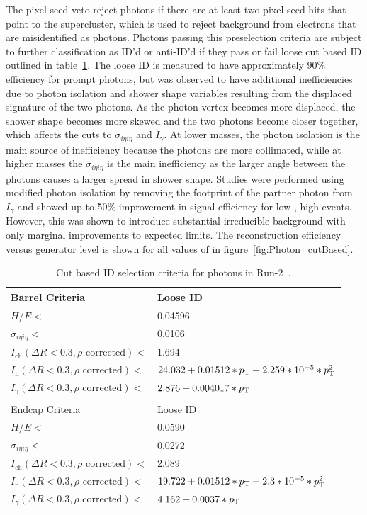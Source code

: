 The pixel seed veto reject photons if there are at least two pixel seed hits that point to the supercluster, which is used to reject background from electrons that are misidentified as photons. Photons passing this preselection criteria are subject to further classification as ID'd or anti-ID'd if they pass or fail loose cut based ID outlined in table~\ref{tab:photonID}. The loose ID is measured to have approximately 90\% efficiency for prompt photons, but was observed to have additional inefficiencies due to photon isolation and shower shape variables resulting from the displaced signature of the two photons. As the photon vertex becomes more displaced, the shower shape becomes more skewed and the two photons become closer together, which affects the cuts to $\sigma_{i\eta i\eta}$ and $I_\gamma$. At lower masses, the photon isolation is the main source of inefficiency because the photons are more collimated, while at higher masses the $\sigma_{i\eta i\eta}$ is the main inefficiency as the larger angle between the photons causes a larger spread in shower shape. Studies were performed using modified photon isolation by removing the footprint of the partner photon from $I_\gamma$ and showed up to 50\% improvement in signal efficiency for low \mphi, high \lxy events. However, this was shown to introduce substantial irreducible background with only marginal improvements to expected limits. The reconstruction efficiency versus generator level \lxy is shown for all values of \mphi in figure~\ref{fig:Photon_cutBased}.

\begin{table}[htb!]
	\centering
	\caption[Cut based ID selection criteria for photons in Run-2~\cite{photonid}.]{Cut based ID selection criteria for photons in Run-2~\cite{photonid}.}
	\label{tab:photonID}
	\begin{tabular}{l | l}
		\hline
		Barrel Criteria & Loose ID \\
		\hline
		\hline
		$H/E<$ & 0.04596\\
		$\sigma_{i\eta i\eta}<$ & 0.0106\\
		$I_\text{ch}(\Delta R<0.3,\rho\text{ corrected})<$ & 1.694\\
		$I_\text{n}(\Delta R<0.3,\rho\text{ corrected})<$ & $24.032+0.01512*p_\mathrm{T}+2.259*10^{-5}*p_\mathrm{T}^2$\\
		$I_\gamma(\Delta R<0.3,\rho\text{ corrected})<$ & $2.876+0.004017*p_\mathrm{T}$\\
		\hline
		\multicolumn{2}{l}{}\\
		\hline
		Endcap Criteria & Loose ID \\
		\hline
		\hline
		$H/E<$ & 0.0590\\
		$\sigma_{i\eta i\eta}<$ & 0.0272\\
		$I_\text{ch}(\Delta R<0.3,\rho\text{ corrected})<$ & 2.089\\
		$I_\text{n}(\Delta R<0.3,\rho\text{ corrected})<$ & $19.722+0.01512*p_\mathrm{T}+2.3*10^{-5}*p_\mathrm{T}^2$\\
		$I_\gamma(\Delta R<0.3,\rho\text{ corrected})<$ & $4.162+0.0037*p_\mathrm{T}$\\
		\hline
	\end{tabular}
\end{table}

